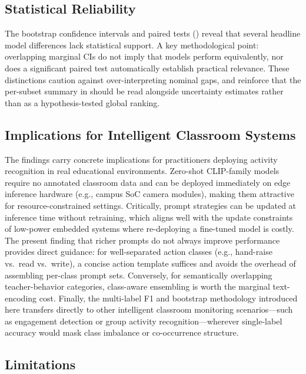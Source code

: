 \documentclass[electronics,article,submit,pdftex,moreauthors]{Definitions/mdpi}
\begin{document}
\subsection{Statistical Reliability}
\label{sec:discuss_bootstrap}

The bootstrap confidence intervals and paired tests () reveal that several headline model differences lack statistical support. A key methodological point: overlapping marginal CIs do not imply that models perform equivalently, nor does a significant paired test automatically establish practical relevance. These distinctions caution against over-interpreting nominal gaps, and reinforce that the per-subset summary in  should be read alongside uncertainty estimates rather than as a hypothesis-tested global ranking.

\subsection{Implications for Intelligent Classroom Systems}

The findings carry concrete implications for practitioners deploying activity recognition in real educational environments. Zero-shot CLIP-family models require no annotated classroom data and can be deployed immediately on edge inference hardware (e.g., campus SoC camera modules), making them attractive for resource-constrained settings. Critically, prompt strategies can be updated at inference time without retraining, which aligns well with the update constraints of low-power embedded systems where re-deploying a fine-tuned model is costly. The present finding that richer prompts do not always improve performance provides direct guidance: for well-separated action classes (e.g., hand-raise vs.\ read vs.\ write), a concise action template suffices and avoids the overhead of assembling per-class prompt sets. Conversely, for semantically overlapping teacher-behavior categories, class-aware ensembling is worth the marginal text-encoding cost. Finally, the multi-label F1 and bootstrap methodology introduced here transfers directly to other intelligent classroom monitoring scenarios---such as engagement detection or group activity recognition---wherever single-label accuracy would mask class imbalance or co-occurrence structure.

\subsection{Limitations}
\end{document}
